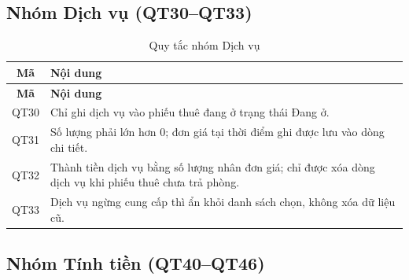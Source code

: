 \documentclass[14pt]{report}
\begin{document}
\subsection{Nhóm Dịch vụ (QT30--QT33)}

\begin{longtable}{|c|p{12cm}|}
\caption{Quy tắc nhóm Dịch vụ}\\\hline
\textbf{Mã} & \textbf{Nội dung}\\\hline
\endfirsthead
\hline \textbf{Mã} & \textbf{Nội dung}\\\hline
\endhead
QT30 & Chỉ ghi dịch vụ vào phiếu thuê đang ở trạng thái Đang ở. \\\hline
QT31 & Số lượng phải lớn hơn 0; đơn giá tại thời điểm ghi được lưu vào dòng chi tiết. \\\hline
QT32 & Thành tiền dịch vụ bằng số lượng nhân đơn giá; chỉ được xóa dòng dịch vụ khi phiếu thuê chưa trả phòng. \\\hline
QT33 & Dịch vụ ngừng cung cấp thì ẩn khỏi danh sách chọn, không xóa dữ liệu cũ. \\\hline
\end{longtable}

\subsection{Nhóm Tính tiền (QT40--QT46)}
\label{sec:tinh-tien}
\end{document}
